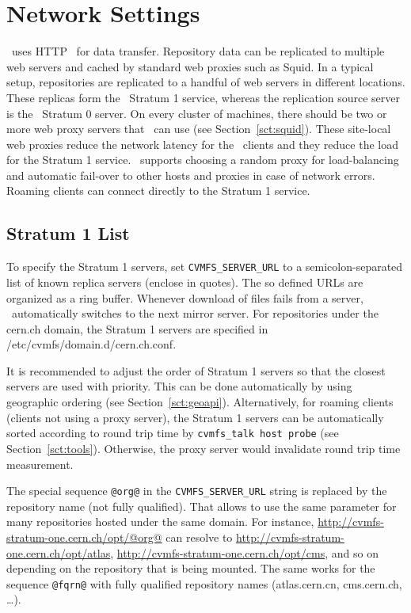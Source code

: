\section{Network Settings}
\label{sct:config:network}
\cvmfs\ uses HTTP~\cite{rfc1945,rfc2616} for data transfer.
Repository data can be replicated to multiple web servers and cached by standard web proxies such as Squid.
In a typical setup, repositories are replicated to a handful of web servers in different locations.
These replicas form the \cvmfs\ Stratum 1 service, whereas the replication source server is the \cvmfs\ Stratum 0 server.
On every cluster of machines, there should be two or more web proxy servers that \cvmfs\ can use (see Section~\ref{sct:squid}).
These site-local web proxies reduce the network latency for the \cvmfs\ clients and they reduce the load for the Stratum 1 service.
\cvmfs\ supports choosing a random proxy for load-balancing and automatic fail-over to other hosts and proxies in case of network errors.
Roaming clients can connect directly to the Stratum 1 service.

\subsection{Stratum 1 List}
To specify the Stratum 1 servers, set \texttt{CVMFS\_SERVER\_URL} to a semicolon-separated list of known replica servers (enclose in quotes). 
The so defined URLs are organized as a ring buffer.
Whenever download of files fails from a server, \cvmfs\ automatically switches to the next mirror server.
For repositories under the cern.ch domain, the Stratum 1 servers are specified in /etc/cvmfs/domain.d/cern.ch.conf.

It is recommended to adjust the order of Stratum 1 servers so that
the closest servers are used with priority.  This can be done
automatically by using geographic ordering (see Section~\ref{sct:geoapi}).
Alternatively, for roaming clients (\ie clients not using a proxy server),
the Stratum 1 servers can be automatically sorted according to round trip
time by \texttt{cvmfs\_talk host probe} (see Section~\ref{sct:tools}).
Otherwise, the proxy server would invalidate round trip time measurement.

The special sequence \texttt{@org@} in the \texttt{CVMFS\_SERVER\_URL} string is replaced by the repository name (not fully qualified).
That allows to use the same parameter for many repositories hosted under the same domain.
For instance, \url{http://cvmfs-stratum-one.cern.ch/opt/@org@} can resolve to \url{http://cvmfs-stratum-one.cern.ch/opt/atlas}, \url{http://cvmfs-stratum-one.cern.ch/opt/cms}, and so on depending on the repository that is being mounted.
The same works for the sequence \texttt{@fqrn@} with fully qualified repository names (\eg atlas.cern.cn, cms.cern.ch, \dots).

